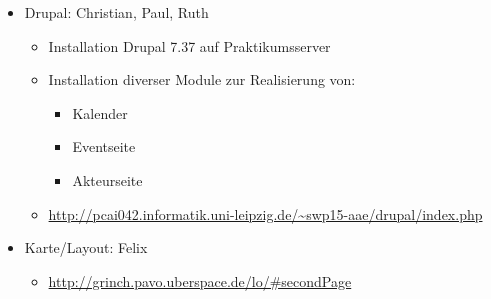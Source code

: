 \documentclass{swp}
\begin{document}
\\\\\\\\\\

\begin{itemize} 
\item Drupal: Christian, Paul, Ruth
\begin{itemize}
\item Installation Drupal 7.37 auf Praktikumsserver
\item Installation diverser Module zur Realisierung von:
\begin{itemize}
\item Kalender
\item Eventseite
\item Akteurseite
\end{itemize}
\item \url{http://pcai042.informatik.uni-leipzig.de/~swp15-aae/drupal/index.php}
\end{itemize}
\item Karte/Layout: Felix
\begin{itemize}
\item \url{http://grinch.pavo.uberspace.de/lo/#secondPage}
\end{itemize}
\end{itemize}
\end{document}

